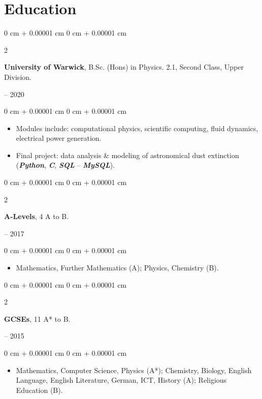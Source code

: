 \documentclass[10pt, letterpaper]{article}
\newenvironment{highlights}{
    \begin{itemize}[
        topsep=0.2 cm,
        parsep=0.2 cm,
        partopsep=0pt,
        itemsep=0.025 cm,
        leftmargin=0 cm + 10pt
    ]
}{
    \end{itemize}
}
\newenvironment{onecolentry}{
    \begin{adjustwidth}{
        0 cm + 0.00001 cm
    }{
        0 cm + 0.00001 cm
    }
}{
    \end{adjustwidth}
}
\newenvironment{twocolentry}[2][]{
    \onecolentry
    \def\secondColumn{#2}
    \setcolumnwidth{\fill, 4.75 cm}
    \begin{paracol}{2}
}{
    \switchcolumn \raggedleft \secondColumn
    \end{paracol}
    \endonecolentry
}
\begin{document}
    \section{Education}
        \begin{twocolentry}{
            2017 – 2020
        }
            \textbf{University of Warwick}, B.Sc. (Hons) in Physics. 2.1, Second Class, Upper Division.
        \end{twocolentry}

        \vspace{0.10 cm}
        \begin{onecolentry}
            \begin{highlights}
                \item Modules include: computational physics, scientific computing, fluid dynamics, electrical power generation.
                \item Final project: data analysis \& modeling of astronomical dust extinction (\textbf{\textit{Python}}, \textbf{\textit{C}}, \textbf{\textit{SQL}} -- \textbf{\textit{MySQL}}).
            \end{highlights}
        \end{onecolentry}
        \vspace{0.20 cm}

        \begin{twocolentry}{
            2015 – 2017
        }
            \textbf{A-Levels}, 4 A to B.
        \end{twocolentry}

        \vspace{0.10 cm}
        \begin{onecolentry}
            \begin{highlights}
                \item Mathematics, Further Mathematics (A); Physics, Chemistry (B).
            \end{highlights}
        \end{onecolentry}

        \vspace{0.20 cm}
        \begin{twocolentry}{
            2010 – 2015
        }
            \textbf{GCSEs}, 11 A* to B.
        \end{twocolentry}
        
        \vspace{0.10 cm}
        \begin{onecolentry}
            \begin{highlights}
            \item Mathematics, Computer Science, Physics (A*); Chemistry, Biology, English Language, English Literature, German, ICT, History (A); Religious Education (B).
            \end{highlights}
        \end{onecolentry}
\end{document}
